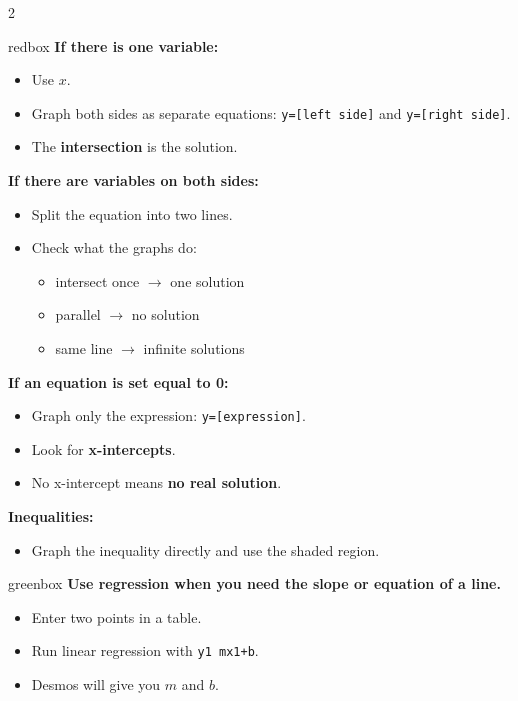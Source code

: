 \documentclass[11pt]{article}
\newcommand{\code}[1]{\texttt{#1}}
\begin{document}
\begin{multicols}{2}
\columnbreak

\begin{skillbox}{redbox}
\textbf{If there is one variable:}
\begin{itemize}
  \item Use \textbf{$x$}.
  \item Graph both sides as separate equations: \code{y=[left side]} and \code{y=[right side]}.
  \item The \textbf{intersection} is the solution.
\end{itemize}

\textbf{If there are variables on both sides:}
\begin{itemize}
  \item Split the equation into two lines.
  \item Check what the graphs do:
  \begin{itemize}
    \item intersect once $\rightarrow$ one solution
    \item parallel $\rightarrow$ no solution
    \item same line $\rightarrow$ infinite solutions
  \end{itemize}
\end{itemize}

\textbf{If an equation is set equal to 0:}
\begin{itemize}
  \item Graph only the expression: \code{y=[expression]}.
  \item Look for \textbf{x-intercepts}.
  \item No x-intercept means \textbf{no real solution}.
\end{itemize}

\textbf{Inequalities:}
\begin{itemize}
  \item Graph the inequality directly and use the shaded region.
\end{itemize}
\end{skillbox}

\vspace{0.4em}

\begin{skillbox}{greenbox}
\textbf{Use regression when you need the slope or equation of a line.}
\begin{itemize}
  \item Enter two points in a table.
  \item Run linear regression with \code{y1~mx1+b}.
  \item Desmos will give you \textbf{$m$} and \textbf{$b$}.
\end{itemize}


\end{skillbox}
\end{multicols}
\end{document}
